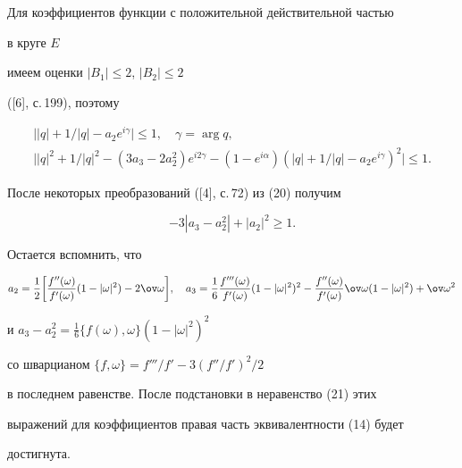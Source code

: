  


Для коэффициентов функции с положительной действительной частью 


в круге $E$ 


имеем оценки $|B_1|\le2$, $|B_2|\le2$ 


([6], с.\,199), поэтому 


\begin{gather} 


\big||q|+1/|q|-a_2e^{i\gamma}\big|\le1,\quad 


\gamma=\arg q,\\ 


\big||q|^2+1/|q|^2-(3a_3-2a^2_2)e^{i2\gamma}- 


(1-e^{i\alpha})(|q|+1/|q|-a_2e^{i\gamma})^2\big|\le1. 


\end{gather} 


После некоторых преобразований ([4], с.\,72) из (20) получим 


\begin{equation} 


-3|a_3-a^2_2|+|a_2|^2\ge1. 


\end{equation} 


Остается вспомнить, что 


$$ 


a_2=\frac{1}{2}\bigg[\frac{f''(\omega)}{f'(\omega)} 


(1-|\omega|^2)-2\ov\omega\bigg],\quad 


a_3=\frac{1}{6}\frac{f'''(\omega)}{f'(\omega)} 


(1-|\omega|^2)^2-\frac{f''(\omega)}{f'(\omega)}\ov\omega 


(1-|\omega|^2)+\ov\omega{}^2 


$$ 


и $a_3-a^2_2=\frac{1}{6}\{f(\omega),\omega\}(1-|\omega|^2)^2$ 


со шварцианом $\{f,\omega\}=f'''/f'-3(f''/f')^2/2$ 


в последнем равенстве. После подстановки в неравенство (21) этих 


выражений для коэффициентов правая часть эквивалентности (14) будет 


достигнута. 


 


